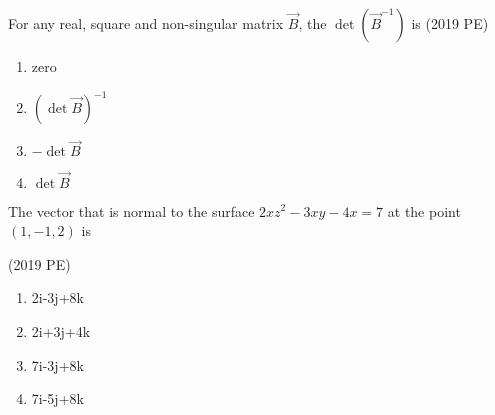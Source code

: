 \item For any real, square and non-singular matrix \( \vec{B} \), the \( \det(\vec{B}^{-1}) \) is
     \hfill{(2019 PE)}
     \begin{multicols}{4}
     \begin{enumerate}
         \item zero
         \item  \((\det \vec{B})^{-1}\)
         \item \(- \det \vec{B}\)
         \item \(\det \vec{B}\)
     \end{enumerate}
     \end{multicols}
    \item The vector that is normal to the surface \( 2x z^{2} - 3xy - 4x = 7 \) at the point \((1, -1, 2)\) is

     \hfill{(2019 PE)}
     \begin{multicols}{4}
    \begin{enumerate}
        \item 2i-3j+8k
        \item 2i+3j+4k
        \item 7i-3j+8k
        \item 7i-5j+8k
    \end{enumerate}
     \end{multicols}

    
